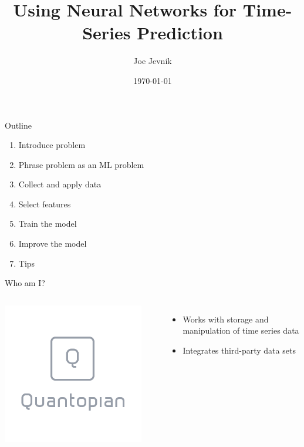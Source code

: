 \documentclass[table]{beamer}
\title{Using Neural Networks for Time-Series Prediction}
\date{\today}
\author{Joe Jevnik}
\institute{PyData NYC 2017}
\begin{document}
\maketitle

\begin{frame}{Outline}
  \begin{enumerate}
  \item Introduce problem
  \item Phrase problem as an ML problem
  \item Collect and apply data
  \item Select features
  \item Train the model
  \item Improve the model
  \item Tips
  \end{enumerate}
\end{frame}

\begin{frame}{Who am I?}
  \begin{columns}
    \begin{center}
      \includegraphics[width=0.90\textwidth]{images/quantopian.png}
    \end{center}

    \begin{itemize}
    \item Works with storage and manipulation of time series data
    \item Integrates third-party data sets
    \end{itemize}
  \end{columns}
\end{frame}
\end{document}
